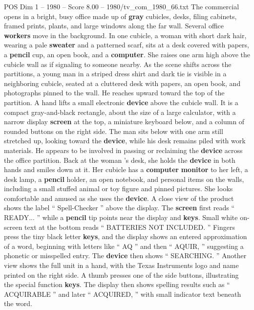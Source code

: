 \begin{textsample}{POS Dim 1 – 1980 – Score 8.00 – 1980/tv\_com\_1980\_66.txt}  \label{ex:f1_pos_055}
The commercial opens in a bright, busy office made up of \textbf{gray} cubicles, desks, filing cabinets, framed prints, plants, and large windows along the far wall.
Several office \textbf{workers} move in the background.
In one cubicle, a woman with short dark hair, wearing a pale \textbf{sweater} and a patterned scarf, sits at a desk covered with papers, a \textbf{pencil} cup, an open book, and a \textbf{computer}.
She raises one arm high above the cubicle wall as if signaling to someone nearby.
As the scene shifts across the partitions, a young man in a striped dress shirt and dark tie is visible in a neighboring cubicle, seated at a cluttered desk with papers, an open book, and photographs pinned to the wall.
He reaches upward toward the top of the partition.
A hand lifts a small electronic \textbf{device} above the cubicle wall.
It is a compact gray-and-black rectangle, about the size of a large calculator, with a narrow display \textbf{screen} at the top, a miniature keyboard below, and a column of rounded buttons on the right side.
The man sits below with one arm still stretched up, looking toward the \textbf{device}, while his desk remains piled with work materials.
He appears to be involved in passing or reclaiming the \textbf{device} across the office partition.
Back at the woman ’s desk, she holds the \textbf{device} in both hands and smiles down at it.
Her cubicle has a \textbf{computer} \textbf{monitor} to her left, a desk lamp, a \textbf{pencil} holder, an open notebook, and personal items on the walls, including a small stuffed animal or toy figure and pinned pictures.
She looks comfortable and amused as she uses the \textbf{device}.
A close view of the product shows the label “ Spell-Checker ” above the display.
The \textbf{screen} first reads “ READY... ” while a \textbf{pencil} tip points near the display and \textbf{keys}.
Small white on-screen text at the bottom reads “ BATTERIES NOT INCLUDED. ” Fingers press the tiny black letter \textbf{keys}, and the display shows an entered approximation of a word, beginning with letters like “ AQ ” and then “ AQUIR, ” suggesting a phonetic or misspelled entry.
The \textbf{device} then shows “ SEARCHING. ” Another view shows the full unit in a hand, with the Texas Instruments logo and name printed on the right side.
A thumb presses one of the side buttons, illustrating the special function \textbf{keys}.
The display then shows spelling results such as “ ACQUIRABLE ” and later “ ACQUIRED, ” with small indicator text beneath the word.

\end{textsample}

